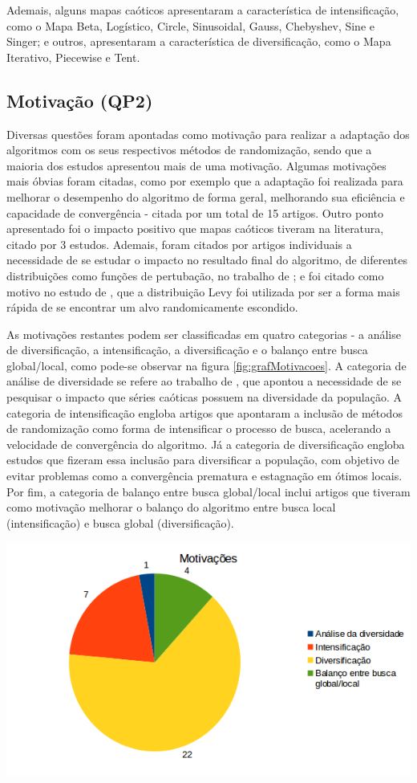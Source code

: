 Ademais, alguns mapas caóticos apresentaram a característica de intensificação, como o Mapa Beta, Logístico, Circle, Sinusoidal, Gauss, Chebyshev, Sine e Singer; e outros, apresentaram a característica de diversificação, como o Mapa Iterativo, Piecewise e Tent. 

\subsection{Motivação (QP2)}

Diversas questões foram apontadas como motivação para realizar a adaptação dos algoritmos com os seus respectivos métodos de randomização, sendo que a maioria dos estudos apresentou mais de uma motivação. Algumas motivações mais óbvias foram citadas, como por exemplo que a adaptação foi realizada para melhorar o desempenho do algoritmo de forma geral, melhorando sua eficiência e capacidade de convergência - citada por um total de 15 artigos. Outro ponto apresentado foi o impacto positivo que mapas caóticos tiveram na literatura, citado por 3 estudos. Ademais, foram citados por artigos individuais a necessidade de se estudar o impacto no resultado final do algoritmo, de diferentes distribuições como funções de pertubação, no trabalho de \cite{yu}; e foi citado como motivo no estudo de \cite{ismail}, que a distribuição Levy foi utilizada por ser a forma mais rápida de se encontrar um alvo randomicamente escondido.

As motivações restantes podem ser classificadas em quatro categorias - a análise de diversificação, a intensificação, a diversificação e o balanço entre busca global/local, como pode-se observar na figura \ref{fig:grafMotivacoes}. A categoria de análise de diversidade se refere ao trabalho de \cite{senserik2}, que apontou a necessidade de se pesquisar o impacto que séries caóticas possuem na diversidade da população. A categoria de intensificação engloba artigos que apontaram a inclusão de métodos de randomização como forma de intensificar o processo de busca, acelerando a velocidade de convergência do algoritmo. Já a categoria de diversificação engloba estudos que fizeram essa inclusão para diversificar a população, com objetivo de evitar problemas como a convergência prematura e estagnação em ótimos locais. Por fim, a categoria de balanço entre busca global/local inclui artigos que tiveram como motivação melhorar o balanço do algoritmo entre busca local (intensificação) e busca global (diversificação).

{
    \centering
    \includegraphics[width=0.7\linewidth]{figuras/graficoMotivacoes.png}
    \label{fig:grafMotivacoes}
}

